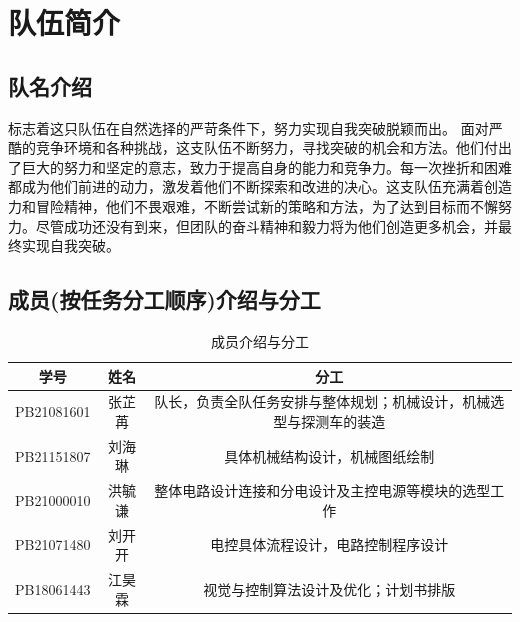 \documentclass[10pt]{ctexart}
\begin{document}
\thispagestyle{empty}

\clearpage
\setcounter{page}{1}
\tableofcontents
\clearpage
\setcounter{page}{1}



\section{队伍简介}
\subsection{队名介绍}

标志着这只队伍在自然选择的严苛条件下，努力实现自我突破脱颖而出。
面对严酷的竞争环境和各种挑战，这支队伍不断努力，寻找突破的机会和方法。他们付出了巨大的努力和坚定的意志，致力于提高自身的能力和竞争力。每一次挫折和困难都成为他们前进的动力，激发着他们不断探索和改进的决心。这支队伍充满着创造力和冒险精神，他们不畏艰难，不断尝试新的策略和方法，为了达到目标而不懈努力。尽管成功还没有到来，但团队的奋斗精神和毅力将为他们创造更多机会，并最终实现自我突破。

\subsection{成员(按任务分工顺序)介绍与分工}

\begin{table}[H]
    \centering
    \caption{成员介绍与分工}
    \begin{tabular}{ccc}
        \toprule
        学号         & 姓名  & 分工                                \\
        \midrule
        PB21081601 & 张芷苒 & 队长，负责全队任务安排与整体规划；机械设计，机械选型与探测车的装造 \\
        PB21151807 & 刘海琳 & 具体机械结构设计，机械图纸绘制                   \\
        PB21000010 & 洪毓谦 & 整体电路设计连接和分电设计及主控电源等模块的选型工作        \\
        PB21071480 & 刘开开 & 电控具体流程设计，电路控制程序设计                 \\
        PB18061443 & 江昊霖 & 视觉与控制算法设计及优化；计划书排版                \\
        \bottomrule
    \end{tabular}
    \label{tab:member}
\end{table}
\end{document}
